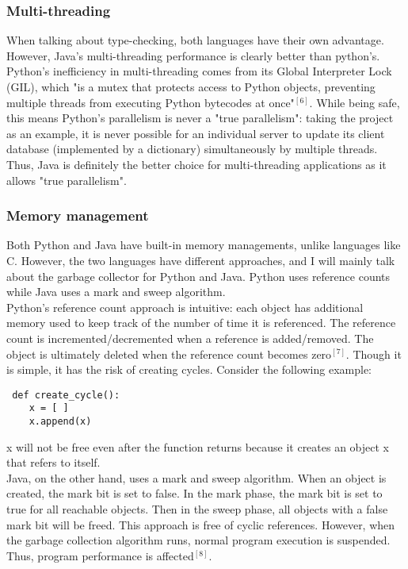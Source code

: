 \documentclass[letterpaper,twocolumn,10pt]{article}
\begin{document}
\subsubsection{Multi-threading}
When talking about type-checking, both languages have their own advantage. However, Java's multi-threading performance is clearly better than python's. Python's inefficiency in multi-threading comes from its Global Interpreter Lock (GIL), which "is a mutex that protects access to Python objects, preventing multiple threads from executing Python bytecodes at once"$^{[6]}$. While being safe, this means Python's parallelism is never a "true parallelism": taking the project as an example, it is never possible for an individual server to update its client database (implemented by a dictionary) simultaneously by multiple threads. Thus, Java is definitely the better choice for multi-threading applications as it allows "true parallelism".

\subsubsection{Memory management}
Both Python and Java have built-in memory managements, unlike languages like C. However, the two languages have different approaches, and I will mainly talk about the garbage collector for Python and Java. Python uses reference counts while Java uses a mark and sweep algorithm. \\

Python's reference count approach is intuitive: each object has additional memory used to keep track of the number of time it is referenced. The reference count is incremented/decremented when a reference is added/removed. The object is ultimately deleted when the reference count becomes zero$^{[7]}$. Though it is simple, it has the risk of creating cycles. Consider the following example:
\begin{verbatim}
 def create_cycle(): 
    x = [ ] 
    x.append(x) 
\end{verbatim}
x will not be free even after the function returns because it creates an object x that refers to itself.\\

Java, on the other hand, uses a mark and sweep algorithm. When an object is created, the mark bit is set to false. In the mark phase, the mark bit is set to true for all reachable objects. Then in the sweep phase, all objects with a false mark bit will be freed. This approach is free of cyclic references. However, when the garbage collection algorithm runs, normal program execution is suspended. Thus, program performance is affected$^{[8]}$.\\
\end{document}
